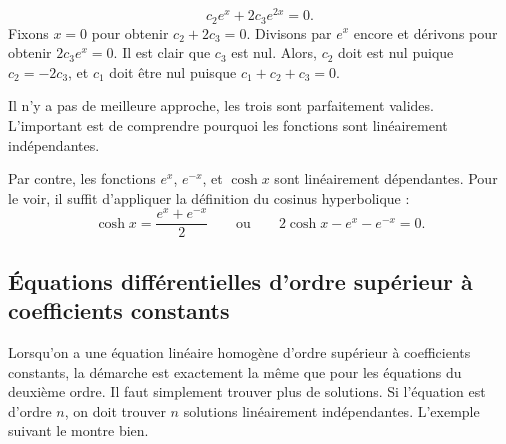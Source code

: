 \begin{example}
	\begin{equation*}
		c_2 e^{x} + 2 c_3 e^{2x} = 0 .
	\end{equation*}
	Fixons  $x=0$ pour obtenir $c_2 + 2c_3 = 0$.  
	Divisons par $e^x$ encore et dérivons pour obtenir $2 c_3 e^{x} = 0$.  Il est clair que   $c_3$ est nul.  
	Alors, $c_2$ doit est nul puique $c_2 = -2c_3$, et $c_1$ doit être nul puisque $c_1 + c_2 + c_3 = 0$.
	
	Il n'y a pas de meilleure approche, les trois sont parfaitement valides. L'important est de comprendre pourquoi les fonctions sont linéairement indépendantes. 
\end{example}
	
\begin{example}
	Par contre, les fonctions  $e^x$, $e^{-x}$, et $\cosh x$ sont linéairement dépendantes.  Pour le voir, il suffit d'appliquer la définition du cosinus hyperbolique : 
	\begin{equation*}
		\cosh x = \frac{e^x + e^{-x}}{2} 	\qquad	\text{ou}	\qquad	2 \cosh x - e^x - e^{-x} = 0.
	\end{equation*}
\end{example}

\subsection[EDO d'ordre supérieur à coefficients constants]{Équations différentielles d'ordre supérieur à coefficients constants}

Lorsqu'on a une équation linéaire homogène d'ordre supérieur à coefficients constants, la démarche est exactement la même que pour les équations du deuxième ordre. Il faut simplement trouver plus de solutions. Si l'équation est d'ordre
$n$, on doit trouver $n$ solutions linéairement indépendantes.
L'exemple suivant le montre bien.

